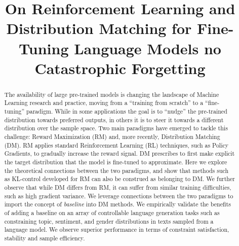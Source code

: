 \title{On Reinforcement Learning and Distribution Matching for Fine-Tuning Language Models no Catastrophic Forgetting}

\begin{abstract}

The availability of large pre-trained models is changing the landscape of Machine Learning research and practice, moving from a ``training from scratch'' to a ``fine-tuning'' paradigm. While in some applications the goal is to ``nudge'' the pre-trained distribution towards preferred outputs, in others it is to steer it towards a different distribution over the sample space. Two main paradigms have emerged to tackle this challenge: Reward Maximization (RM) and, more recently, Distribution Matching (DM). RM applies standard Reinforcement Learning (RL) techniques, such as Policy Gradients, to gradually increase the reward signal. DM prescribes to first make explicit the target distribution that the model is fine-tuned to approximate. Here we explore the theoretical connections between the two paradigms, and show that methods such as KL-control developed for RM can also be construed as belonging to DM. We further observe that while DM differs from RM, it can suffer from similar training difficulties, such as high gradient variance. We leverage connections between the two paradigms to import the concept of \textit{baseline} into DM methods. We empirically validate the benefits of adding a baseline on an array of controllable language generation tasks such as constraining topic, sentiment, and gender distributions in texts sampled from a language model. We observe superior performance in terms of constraint satisfaction, stability and sample efficiency.
\end{abstract}

